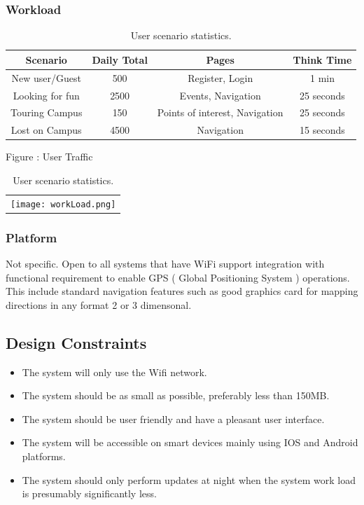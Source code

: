 \documentclass[a4paper,12pt]{report}
\begin{document}
		\subsubsection{Workload}
		\begin{table}[h!]
			\centering
			\caption{User scenario statistics.}
			\label{tab:table1}
			\begin{tabular}{|c|c|c|c|}
				 \hline
				Scenario & Daily Total & Pages & Think Time \\
				\hline
				New user/Guest & 500 & Register, Login & 1 min \\
				\hline
				Looking for fun & 2500 & Events, Navigation & 25 seconds\\
				\hline
				Touring Campus & 150 & Points of interest, Navigation & 25 seconds \\
				\hline
				Lost on Campus & 4500 & Navigation & 15 seconds\\
				\hline
			\end{tabular}
			
			\bigskip
			Figure : User Traffic \\
			\begin{tabular}{l}
				
				\texttt{[image: workLoad.png]}
				
			\end{tabular}
		
		\end{table}
	
		
		\subsubsection{Platform}
		 Not specific. Open to all systems that have WiFi support integration with functional requirement to enable 
		 GPS ( Global Positioning System ) operations. This include standard navigation features such as good graphics 
		 card for mapping directions in any format 2 or 3 dimensonal. 

\newpage
\subsection{Design Constraints}
\begin{itemize}
\item The system will only use the Wifi network.
\item The system should be as small as possible, preferably less than 150MB.
\item The system should be user friendly and have a pleasant user interface.
\item The system will be accessible on smart devices mainly using IOS and Android platforms.
\item The system should only perform updates at night when the system work load is presumably significantly less.
\end{itemize}
\newpage
\end{document}

